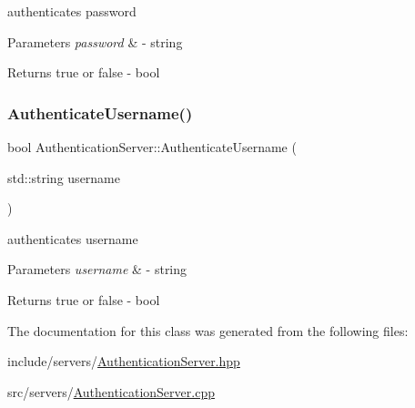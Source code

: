 authenticates password 


\begin{DoxyParams}{Parameters}
{\em password} & -\/ string \\
\hline
\end{DoxyParams}
\begin{DoxyReturn}{Returns}
true or false -\/ bool 
\end{DoxyReturn}
\mbox{\label{class_authentication_server_a5248d41a54e50539c351b36bf2a2fd64}} 
\subsubsection{\texorpdfstring{Authenticate\+Username()}{AuthenticateUsername()}}
{\footnotesize\ttfamily bool Authentication\+Server\+::\+Authenticate\+Username (\begin{DoxyParamCaption}\item[{std\+::string}]{username }\end{DoxyParamCaption})}



authenticates username 


\begin{DoxyParams}{Parameters}
{\em username} & -\/ string \\
\hline
\end{DoxyParams}
\begin{DoxyReturn}{Returns}
true or false -\/ bool 
\end{DoxyReturn}


The documentation for this class was generated from the following files\+:\begin{DoxyCompactItemize}
\item 
include/servers/\mbox{\hyperlink{_authentication_server_8hpp}{Authentication\+Server.\+hpp}}\item 
src/servers/\mbox{\hyperlink{_authentication_server_8cpp}{Authentication\+Server.\+cpp}}\end{DoxyCompactItemize}

